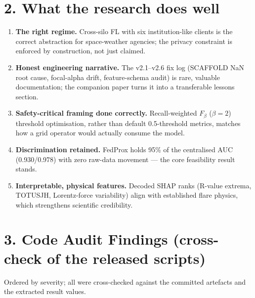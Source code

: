 \documentclass[11pt,a4paper]{article}
\begin{document}
\section*{2. What the research does well}

\begin{enumerate}[leftmargin=2em, itemsep=3pt]
  \item \textbf{The right regime.} Cross-silo FL with six institution-like
  clients is the correct abstraction for space-weather agencies; the
  privacy constraint is enforced by construction, not just claimed.
  \item \textbf{Honest engineering narrative.} The v2.1--v2.6 fix log
  (SCAFFOLD NaN root cause, focal-alpha drift, feature-schema audit) is
  rare, valuable documentation; the companion paper turns it into a
  transferable lessons section.
  \item \textbf{Safety-critical framing done correctly.} Recall-weighted
  $F_\beta$ ($\beta=2$) threshold optimisation, rather than default
  0.5-threshold metrics, matches how a grid operator would actually
  consume the model.
  \item \textbf{Discrimination retained.} FedProx holds 95\% of the
  centralised AUC (0.930/0.978) with zero raw-data movement --- the core
  feasibility result stands.
  \item \textbf{Interpretable, physical features.} Decoded SHAP ranks
  (R-value extrema, TOTUSJH, Lorentz-force variability) align with
  established flare physics, which strengthens scientific credibility.
\end{enumerate}

\section*{3. Code Audit Findings (cross-check of the released scripts)}

Ordered by severity; all were cross-checked against the committed
artefacts and the extracted result values.
\end{document}
